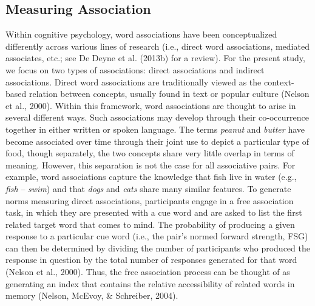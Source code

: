 \documentclass[english,,man]{apa6}
\begin{document}
\hypertarget{measuring-association}{%
\subsection{Measuring Association}\label{measuring-association}}

Within cognitive psychology, word associations have been conceptualized differently across various lines of research (i.e., direct word associations, mediated associates, etc.; see De Deyne et al. (2013b) for a review). For the present study, we focus on two types of associations: direct associations and indirect associations. Direct word associations are traditionally viewed as the context-based relation between concepts, usually found in text or popular culture (Nelson et al., 2000). Within this framework, word associations are thought to arise in several different ways. Such associations may develop through their co-occurrence together in either written or spoken language. The terms \emph{peanut} and \emph{butter} have become associated over time through their joint use to depict a particular type of food, though separately, the two concepts share very little overlap in terms of meaning. However, this separation is not the case for all associative pairs. For example, word associations capture the knowledge that fish live in water (e.g., \emph{fish} -- \emph{swim}) and that \emph{dogs} and \emph{cats} share many similar features. To generate norms measuring direct associations, participants engage in a free association task, in which they are presented with a cue word and are asked to list the first related target word that comes to mind. The probability of producing a given response to a particular cue word (i.e., the pair's normed forward strength, FSG) can then be determined by dividing the number of participants who produced the response in question by the total number of responses generated for that word (Nelson et al., 2000). Thus, the free association process can be thought of as generating an index that contains the relative accessibility of related words in memory (Nelson, McEvoy, \& Schreiber, 2004).
\end{document}

